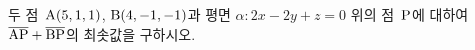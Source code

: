 두 점~$\mathrm{A}(5{,}\mkern3mu\mathopen{}1{,}\mkern3mu\mathopen{}1)$, $\mathrm{B}(4{,}\mkern3mu\mathopen{}-1{,}\mkern3mu\mathopen{}-1)$과 평면 $\alpha\colon 2x-2y+z=0$ 위의 점~$\mathrm{P}$에 대하여 $\overline{\mathrm{AP}}+\overline{\mathrm{BP}}$의 최솟값을 구하시오. 
